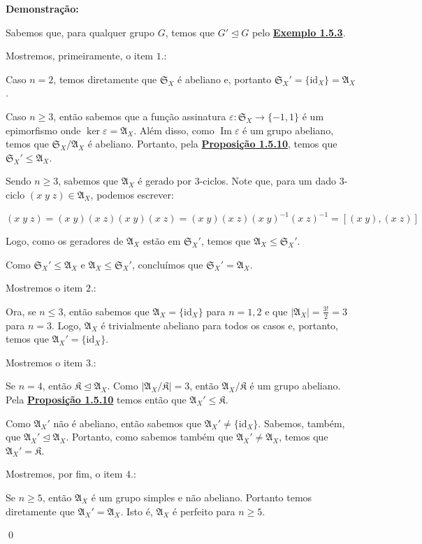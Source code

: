\documentclass[16pt,openany]{book}
\theoremstyle{definition}
\begin{document}
{\color{red}
\textbf{Demonstração:}

Sabemos que, para qualquer grupo $G$, temos que $G' \trianglelefteq G$ pelo \hyperlink{ex153}{\textbf{Exemplo 1.5.3}}.

Mostremos, primeiramente, o item $1.$: 

Caso $n=2$, temos diretamente que $\mathfrak{S}_X$ é abeliano e, portanto $\mathfrak{S}_X' = \{\text{id}_X\} = \mathfrak{A}_X$.

Caso $n\geq 3$, então sabemos que a função assinatura $\varepsilon: \mathfrak{S}_X \to \{-1,1\}$ é um epimorfismo onde $\ker{\varepsilon} = \mathfrak{A}_X$. Além disso, como $\operatorname{Im}{\varepsilon}$ é um grupo abeliano, temos que $\mathfrak{S}_X/\mathfrak{A}_X$ é abeliano. Portanto, pela \hyperlink{prop1510}{\textbf{Proposição 1.5.10}}, temos que $\mathfrak{S}_X' \leq \mathfrak{A}_X$.

Sendo $n\geq 3$, sabemos que $\mathfrak{A}_X$ é gerado por $3$-ciclos. Note que, para um dado $3$-ciclo $(x\;y\;z)\in \mathfrak{A}_X$, podemos escrever:

\[
(x\; y\; z) = (x\; y)(x\; z)(x\; y)(x\; z) = (x\; y)(x\; z)(x\; y)^{-1}(x\; z)^{-1} = [(x\; y), (x\; z)]
\]

Logo, como os geradores de $\mathfrak{A}_X$ estão em $\mathfrak{S}_X'$, temos que $\mathfrak{A}_X \leq \mathfrak{S}_X'$.

Como $\mathfrak{S}_X' \leq \mathfrak{A}_X$ e $\mathfrak{A}_X \leq \mathfrak{S}_X'$, concluímos que $\mathfrak{S}_X' = \mathfrak{A}_X$.

Mostremos o item $2.$:

Ora, se $n\leq 3$, então sabemos que $\mathfrak{A}_X = \{\text{id}_X\}$ para $n=1,2$ e que $\vert\mathfrak{A}_X\vert = \frac{3!}{2} = 3$ para $n = 3$. Logo, $\mathfrak{A}_X$ é trivialmente abeliano para todos os casos e, portanto, temos que $\mathfrak{A}_X' = \{\text{id}_X\}$.


Mostremos o item $3.$:

Se $n=4$, então $\mathfrak{K} \trianglelefteq \mathfrak{A}_X$. Como $\vert \mathfrak{A}_X/\mathfrak{K}\vert = 3$, então $\mathfrak{A}_X/\mathfrak{K}$ é um grupo abeliano. Pela \hyperlink{prop1510}{\textbf{Proposição 1.5.10}} temos então que $\mathfrak{A}_X' \leq \mathfrak{K}$.

Como $\mathfrak{A}_X'$ não é abeliano, então sabemos que $\mathfrak{A}_X' \neq \{\text{id}_X\}$. Sabemos, também, que $\mathfrak{A}_X' \trianglelefteq \mathfrak{A}_X$. Portanto, como sabemos também que $\mathfrak{A}_X' \neq \mathfrak{A}_X$, temos que $\mathfrak{A}_X' = \mathfrak{K}$.

Mostremos, por fim, o item $4.$:

Se $n\geq 5$, então $\mathfrak{A}_X$ é um grupo simples e não abeliano. Portanto temos diretamente que $\mathfrak{A}_X' = \mathfrak{A}_X$. Isto é, $\mathfrak{A}_X$ é perfeito para $n\geq 5$.
 
\qed}
\end{document}
